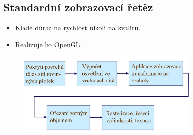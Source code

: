 \subsection{Standardní zobrazovací řetěz}
\begin{itemize}
	\item Klade důraz na rychlost nikoli na kvalitu.
	\item Realizuje ho OpenGL.
\end{itemize}
\begin{figure}[H]
\centering
\includegraphics[width=0.8\textwidth]{assets/5_retezec}
\end{figure}

